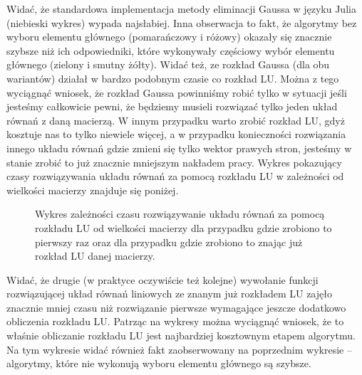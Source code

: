 \documentclass[]{article}
\begin{document}
Widać, że standardowa implementacja metody eliminacji Gaussa w języku Julia (niebieski wykres) wypada najsłabiej. Inna obserwacja to fakt, że algorytmy bez wyboru elementu głównego (pomarańczowy i różowy) okazały się znacznie szybsze niż ich odpowiedniki, które wykonywały częściowy wybór elementu głównego (zielony i smutny żółty). Widać też, ze rozkład Gaussa (dla obu wariantów) działał w bardzo podobnym czasie co rozkład LU. Można z tego wyciągnąć wniosek, że rozkład Gaussa powinniśmy robić tylko w sytuacji jeśli jesteśmy całkowicie pewni, że będziemy musieli rozwiązać tylko jeden układ równań z daną macierzą. W innym przypadku warto zrobić rozkład LU, gdyż kosztuje nas to tylko niewiele więcej, a w przypadku konieczności rozwiązania innego układu równań gdzie zmieni się tylko wektor prawych stron, jesteśmy w stanie zrobić to już znacznie mniejszym nakładem pracy. Wykres pokazujący czasy rozwiązywania układu równań za pomocą rozkładu LU w zależności od wielkości macierzy znajduje się poniżej.
\clearpage

\begin{figure}[h]
	\centering
	 \hfill
	\caption*{Wykres zależności czasu rozwiązywanie układu równań za pomocą rozkładu LU od wielkości macierzy dla przypadku gdzie zrobiono to pierwszy raz oraz dla przypadku gdzie zrobiono to znając już rozkład LU danej macierzy.}
\end{figure}

Widać, że drugie (w praktyce oczywiście też kolejne) wywołanie funkcji rozwiązującej układ równań liniowych ze znanym już rozkładem LU zajęło znacznie mniej czasu niż rozwiązanie pierwsze wymagające jeszcze dodatkowo obliczenia rozkładu LU. Patrząc na wykresy można wyciągnąć wniosek, że to właśnie obliczanie rozkładu LU jest najbardziej kosztownym etapem algorytmu. Na tym wykresie widać również fakt zaobserwowany na poprzednim wykresie -- algorytmy, które nie wykonują wyboru elementu głównego są szybsze.
\end{document}
